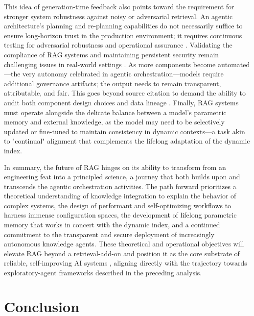 \documentclass[11pt,a4paper]{article}
\begin{document}
This idea of generation-time feedback also points toward the requirement for stronger system robustness against noisy or adversarial retrieval. An agentic architecture's planning and re-planning capabilities do not necessarily suffice to ensure long-horizon trust in the production environment; it requires continuous testing for adversarial robustness and operational assurance \cite{arxiv:2601.07711v2,arxiv:2504.20119v2}. Validating the compliance of RAG systems and maintaining persistent security remain challenging issues in real-world settings \cite{arxiv:2506.20869v3}. As more components become automated---the very autonomy celebrated in agentic orchestration---models require additional governance artifacts; the output needs to remain transparent, attributable, and fair. This goes beyond source citation to demand the ability to audit both component design choices and data lineage \cite{arxiv:2604.02640v1}. Finally, RAG systems must operate alongside the delicate balance between a model's parametric memory and external knowledge, as the model may need to be selectively updated or fine-tuned to maintain consistency in dynamic contexts---a task akin to "continual" alignment that complements the lifelong adaptation of the dynamic index.

In summary, the future of RAG hinges on its ability to transform from an engineering feat into a principled science, a journey that both builds upon and transcends the agentic orchestration activities. The path forward prioritizes a theoretical understanding of knowledge integration to explain the behavior of complex systems, the design of performant and self-optimizing workflows to harness immense configuration spaces, the development of lifelong parametric memory that works in concert with the dynamic index, and a continued commitment to the transparent and secure deployment of increasingly autonomous knowledge agents. These theoretical and operational objectives will elevate RAG beyond a retrieval-add-on and position it as the core substrate of reliable, self-improving AI systems \cite{arxiv:2312.10997v5}, aligning directly with the trajectory towards exploratory-agent frameworks described in the preceding analysis.


\section{Conclusion}
\end{document}
